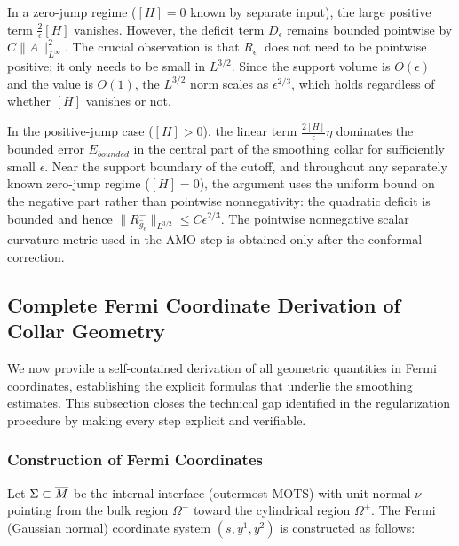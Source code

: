 \begin{remark}
In a zero-jump regime ($[H]=0$ known by separate input), the large positive term $\frac{2}{\epsilon}[H]$ vanishes. However, the deficit term $D_\epsilon$ remains bounded pointwise by $C\|A\|_{L^\infty}^2$.
The crucial observation is that $R^-_\epsilon$ does not need to be pointwise positive; it only needs to be small in $L^{3/2}$.
Since the support volume is $O(\epsilon)$ and the value is $O(1)$, the $L^{3/2}$ norm scales as $\epsilon^{2/3}$, which holds regardless of whether $[H]$ vanishes or not.
\end{remark}

\begin{lemma}
In the positive-jump case ($[H] > 0$), the linear term $\frac{2[H]}{\epsilon}\eta$ dominates the bounded error $E_{bounded}$ in the central part of the smoothing collar for sufficiently small $\epsilon$. Near the support boundary of the cutoff, and throughout any separately known zero-jump regime ($[H]=0$), the argument uses the uniform bound on the negative part rather than pointwise nonnegativity: the quadratic deficit is bounded and hence $\|R^-_{\hat g_\epsilon}\|_{L^{3/2}}\le C\epsilon^{2/3}$. The pointwise nonnegative scalar curvature metric used in the AMO step is obtained only after the conformal correction.
\end{lemma}

\subsection{Complete Fermi Coordinate Derivation of Collar Geometry}
\label{sec:FermiCollarComplete}

We now provide a self-contained derivation of all geometric quantities in Fermi coordinates, establishing the explicit formulas that underlie the smoothing estimates. This subsection closes the technical gap identified in the regularization procedure by making every step explicit and verifiable.

\subsubsection{Construction of Fermi Coordinates}

Let $\Sigma \subset \overline{M}$ be the internal interface (outermost MOTS) with unit normal $\nu$ pointing from the bulk region $\Omega^-$ toward the cylindrical region $\Omega^+$. The Fermi (Gaussian normal) coordinate system $(s, y^1, y^2)$ is constructed as follows:

